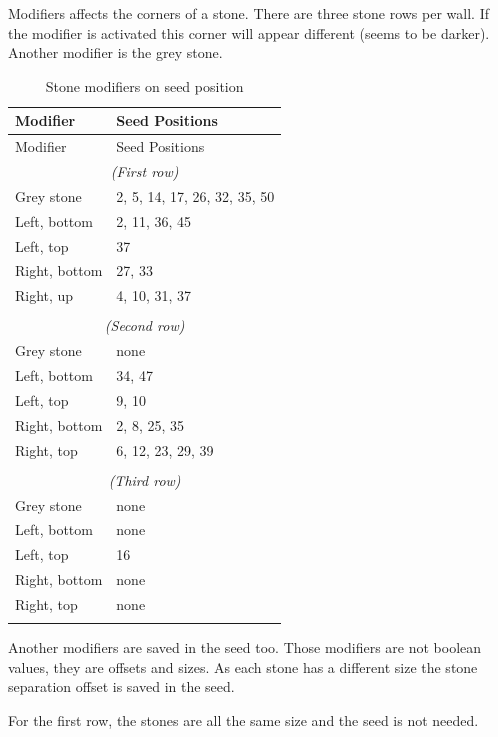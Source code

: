 \documentclass{article}
\begin{document}
 Modifiers affects the corners of a stone. There are three stone rows per
 wall. If the modifier is activated this corner will appear different
 (seems to be darker). Another modifier is the grey stone.

\renewcommand{\tabcolsep}{1em}
\begin{longtable}{ll}
  \hline
 Modifier      & Seed Positions \\
  \hline
 \endfirsthead
  \hline
 Modifier      & Seed Positions \\
  \hline
 \endhead
 \multicolumn{2}{c}{{\it (First row)}} \\
\hline
 Grey stone    & 2, 5, 14, 17, 26, 32, 35, 50 \\
 Left, bottom  & 2, 11, 36, 45 \\
 Left, top     & 37 \\
 Right, bottom & 27, 33 \\
 Right, up     & 4, 10, 31, 37 \\
 \\
\hline
 \multicolumn{2}{c}{{\it (Second row)}} \\
\hline
 Grey stone    & none  \\
 Left, bottom  & 34, 47 \\
 Left, top     & 9, 10 \\
 Right, bottom & 2, 8, 25, 35 \\
 Right, top    & 6, 12, 23, 29, 39 \\
 \\
\hline
 \multicolumn{2}{c}{{\it (Third row)}} \\
\hline
 Grey stone    & none  \\
 Left, bottom  & none \\
 Left, top     & 16 \\
 Right, bottom & none \\
 Right, top    & none \\
\hline
\caption{Stone modifiers on seed position}
\label{seeds}
\end{longtable}

 Another modifiers are saved in the seed too. Those modifiers are not
 boolean values, they are offsets and sizes. As each stone has a different
 size the stone separation offset is saved in the seed.

 For the first row, the stones are all the same size and the seed is not
 needed.
\end{document}
